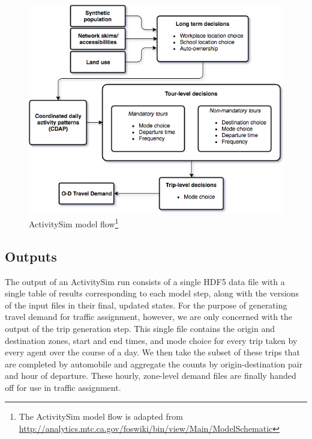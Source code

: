 \begin{figure}[htbp]
    \center
    \includegraphics[width=\textwidth]{graphics/asim_flow.png}
    \caption[ActivitySim model flow]{ActivitySim model flow\footnote{The ActivitySim model flow is adapted from \url{http://analytics.mtc.ca.gov/foswiki/bin/view/Main/ModelSchematic}}}
    \label{fig:asim-models}
\end{figure}

\subsection{Outputs}

The output of an ActivitySim run consists of a single HDF5 data file with a single table of results corresponding to each model step, along with the versions of the input files in their final, updated states. For the purpose of generating travel demand for traffic assignment, however, we are only concerned with the output of the trip generation step. This single file contains the origin and destination zones, start and end times, and mode choice for every trip taken by every agent over the course of a day. We then take the subset of these trips that are completed by automobile and aggregate the counts by origin-destination pair and hour of departure. These hourly, zone-level demand files are finally handed off for use in traffic assignment.

